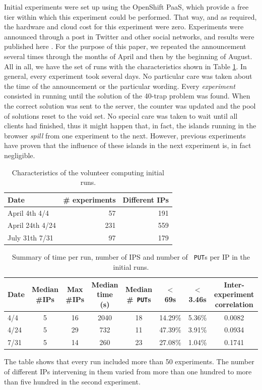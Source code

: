 \documentclass[journal,onecolumn]{IEEEtran}
\begin{document}
Initial experiments were set up using the OpenShift
PaaS, which provide a free tier within which this 
experiment could be performed. That way, and as required, the hardware
and cloud cost for this experiment were zero. Experiments were
announced through a post in Twitter and other social networks, and
results were published here \cite{DBLP:conf/gecco/GuervosG15}. For the
purpose of this paper, we repeated the announcement several times
through the months of April and then by the beginning of August. All
in all, we have the set of runs with the characteristics shown in
Table \ref{tab:runs}. In general, every experiment took several
days. No particular care was taken about the time of the announcement
or the particular wording. Every {\em experiment} consisted in running
until the solution of the 40-trap problem was found. When the correct
solution was sent to the server, the counter was updated and the pool
of solutions reset to the void set. No special care was taken to wait
until all clients had finished, thus it might happen that, in fact,
the islands running in the browser {\em spill} from one experiment to
the next. However, previous experiments have proven that the influence
of these islands in the next experiment is, in fact negligible.
%
\begin{table}
\caption{Characteristics of the volunteer computing initial runs. \label{tab:runs}}
\begin{center}
\begin{tabular}{l|rr}
\hline
Date & \# experiments & Different IPs \\
\hline
April 4th 4/4 & 57 & 191 \\
April 24th 4/24 &  231 & 559 \\
July 31th 7/31 & 97 & 179 \\
\hline
\end{tabular}
\end{center}
\end{table}
%
\begin{table}
\caption{Summary of time per run, number of IPS and number of {\tt
    PUT}s per IP in the initial runs. \label{tab:summary:os}}
\begin{center}
\begin{tabular}{l|ccccccc}
\hline
Date & Median \#IPs & Max \#IPs & Median time (s) & Median \#{\tt
  PUT}s & $<$ 69s & $<$ 3.46s & Inter-experiment correlation\\
\hline
4/4 & 5 & 16 & 2040 & 18 & 14.29\% & 5.36\% & 0.0082 \\
4/24 &  5 & 29 & 732 & 11 & 47.39\% & 3.91\% & 0.0934\\
7/31 & 5 & 14 & 260 & 23 & 27.08\% & 1.04\%  & 0.1741\\
\hline
\end{tabular}
\end{center}
\end{table}
%
The table shows that every run included more than 50 experiments. The
number of different IPs intervening in them varied from more than one
hundred to more than five hundred in the second experiment.
\end{document}
